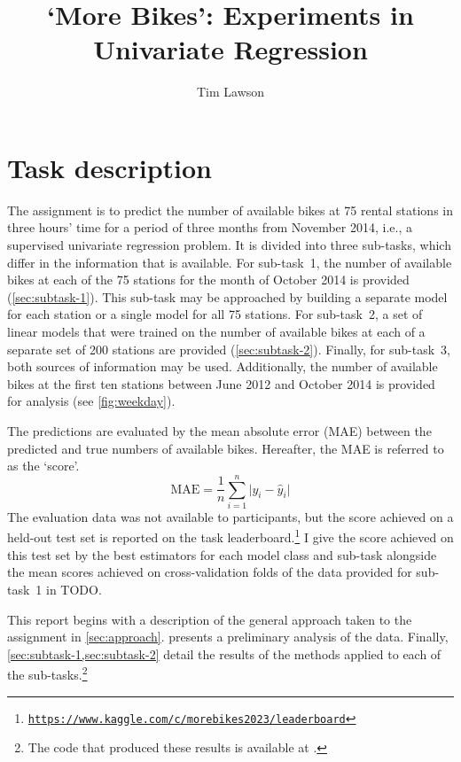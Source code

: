 \documentclass[11pt]{extarticle}
\newcommand{\kaggle}{https://www.kaggle.com/c/morebikes2023/leaderboard}
\begin{document}
\title{`More Bikes': Experiments in Univariate Regression}
\author[]{Tim Lawson}
\date{}

\maketitle

\section{Task description}
\label{sec:task-description}

The assignment is to predict the number of available bikes at 75 rental stations in
three hours' time for a period of three months from November 2014, i.e., a supervised
univariate regression problem.
It is divided into three sub-tasks, which differ in the information that is available.
For sub-task~1, the number of available bikes at each of the 75 stations for the month
of October 2014 is provided (\cref{sec:subtask-1}).
This sub-task may be approached by building a separate model for each station or a
single model for all 75 stations.
For sub-task~2, a set of linear models that were trained on the number of available
bikes at each of a separate set of 200 stations are provided (\cref{sec:subtask-2}).
Finally, for sub-task~3, both sources of information may be used.
Additionally, the number of available bikes at the first ten stations between June 2012
and October 2014 is provided for analysis (see \cref{fig:weekday}).

The predictions are evaluated by the mean absolute error (MAE) between the predicted
and true numbers of available bikes.
Hereafter, the MAE is referred to as the `score'.
\begin{equation}
  \label{eq:mae}
  \text{MAE} = \frac{1}{n} \sum_{i = 1}^n \lvert y_i - \hat{y}_i \rvert
\end{equation}
The evaluation data was not available to participants, but the score achieved on a
held-out test set is reported on the task
leaderboard.\footnote{\href{\kaggle}{\texttt{\kaggle}}} I give the score achieved on
this test set by the best estimators for each model class and sub-task alongside the
mean scores achieved on cross-validation folds of the data provided for sub-task~1 in
TODO.

This report begins with a description of the general approach taken to the assignment
in \cref{sec:approach}.
 presents a preliminary analysis of the data.
Finally, \cref{sec:subtask-1,sec:subtask-2} detail the results of the methods applied
to each of the sub-tasks.\footnote{The code that produced these results is available at
  .
}
\end{document}
